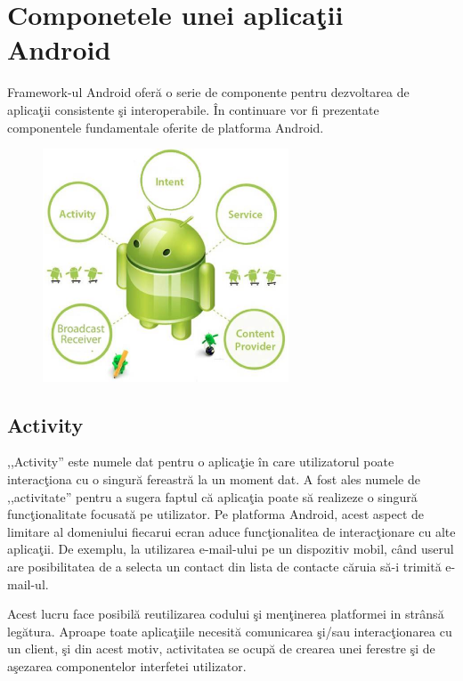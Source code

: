 \chapter{Componetele unei aplica\c tii Android}

Framework-ul Android ofer\u a o serie de componente pentru dezvoltarea de aplica\c tii consistente \c si interoperabile. \^In continuare vor fi prezentate componentele fundamentale oferite de platforma Android.\cite{3}
\begin{center}
\begin{figure}[!hp]
\includegraphics[width=0.65\textwidth]
{imagini/components-of-android.eps}
\end{figure}
\end{center}

\section{Activity}

,,Activity'' este numele dat pentru o aplica\c tie \^in care utilizatorul poate interac\c tiona cu o singur\u a fereastr\u a la un moment dat. A fost ales numele de ,,activitate'' pentru a sugera faptul c\u a aplica\c tia poate s\u a realizeze o singur\u a func\c tionalitate focusat\u a pe utilizator.\newline 
Pe platforma Android, acest aspect de limitare al domeniului fiecarui ecran aduce func\c tionalitea de interac\c tionare cu alte aplica\c tii. De exemplu, la utilizarea e-mail-ului pe un dispozitiv mobil, c\^and userul are posibilitatea de a selecta un contact din lista de contacte c\u aruia s\u a-i trimit\u a e-mail-ul.\newline 

Acest lucru face posibil\u a reutilizarea codului \c si men\c tinerea platformei in str\^ans\u a leg\u atura.\newline
Aproape toate aplica\c tiile necesit\u a comunicarea \c si/sau interac\c tionarea cu un client, \c si din acest motiv, activitatea se ocup\u a de crearea unei ferestre \c si de a\c sezarea componentelor interfetei utilizator.\cite{3}\newline 

